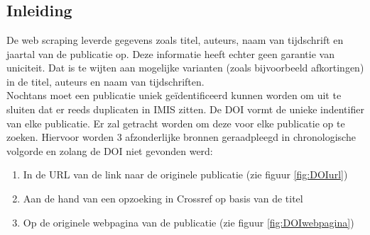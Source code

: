 
\chapter{}%
\label{ch:linked_data}

\section{Inleiding}
De web scraping leverde gegevens zoals titel, auteurs, naam van tijdschrift en jaartal van de publicatie op. Deze informatie heeft echter geen garantie van uniciteit. Dat is te wijten aan mogelijke varianten (zoals bijvoorbeeld afkortingen) in de titel, auteurs en naam van tijdschriften.\\
Nochtans moet een publicatie uniek geïdentificeerd kunnen worden om uit te sluiten dat er reeds duplicaten in IMIS zitten.
De DOI vormt de unieke indentifier van elke publicatie. Er zal getracht worden om deze voor elke publicatie op te zoeken. Hiervoor worden 3 afzonderlijke bronnen geraadpleegd in chronologische volgorde en zolang de DOI niet gevonden werd:
\begin{enumerate}
    \item In de URL van de link naar de originele publicatie (zie figuur \ref{fig:DOIurl})
    \item Aan de hand van een opzoeking in Crossref op basis van de titel
    \item Op de originele webpagina van de publicatie (zie figuur \ref{fig:DOIwebpagina})
\end{enumerate}

